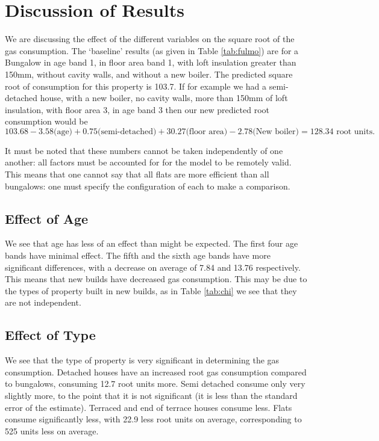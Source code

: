 \documentclass[9pt]{extarticle}
\begin{document}
\section{Discussion of Results}

We are discussing the effect of the different variables on the square root of the gas consumption. The `baseline' results (as given in Table \ref{tab:fulmo}) are for a Bungalow in age band 1, in floor area band 1, with loft insulation greater than 150mm, without cavity walls, and without a new boiler. The predicted square root of consumption for this property is 103.7. If for example we had a semi-detached house, with a new boiler, no cavity walls, more than 150mm of loft insulation, with floor area 3, in age band 3 then our new predicted root consumption would be $$103.68 - 3.58 \text{(age)} + 0.75 \text{(semi-detached)} + 30.27 \text{(floor area)} - 2.78 \text{(New boiler)} = 128.34 \text{ root units}.$$

It must be noted that these numbers cannot be taken independently of one another: all factors must be accounted for for the model to be remotely valid. This means that one cannot say that all flats are more efficient than all bungalows: one must specify the configuration of each to make a comparison.

\subsection{Effect of Age}
We see that age has less of an effect than might be expected. The first four age bands have minimal effect. The fifth and the sixth age bands have more significant differences, with a decrease on average of 7.84 and 13.76 respectively. This means that new builds have decreased gas consumption. This may be due to the types of property built in new builds, as in Table \ref{tab:chi} we see that they are not independent.

\subsection{Effect of Type}
We see that the type of property is very significant in determining the gas consumption. Detached houses have an increased root gas consumption compared to bungalows, consuming 12.7 root units more. Semi detached consume only very slightly more, to the point that it is not significant (it is less than the standard error of the estimate). Terraced and end of terrace houses consume less. Flats consume significantly less, with 22.9 less root units on average, corresponding to 525 units less on average. 
\end{document}
